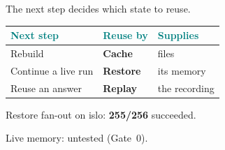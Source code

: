 \begin{frame}[t]{\ev{\tagM\,\tagP}The next step decides which state to reuse.}
\vspace{.1cm}
{\fontsize{14}{17}\selectfont\renewcommand{\arraystretch}{1.32}
\begin{tabularx}{\linewidth}{@{}L{5.1cm}L{3.6cm}Y@{}}
\toprule
\textcolor{Teal}{\textbf{Next step}} & \textcolor{Teal}{\textbf{Reuse by}} & \textcolor{Teal}{\textbf{Supplies}}\\
\midrule
Rebuild & \textbf{Cache} & files\\
Continue a live run & \textbf{Restore} & its memory\\
Reuse an answer & \textbf{Replay} & the recording\\
\bottomrule
\end{tabularx}\par}
\vspace{.4cm}
{\fontsize{13}{17}\selectfont\tagM\enspace Restore fan-out on islo: \textbf{255/256} succeeded.\par
\vspace{.12cm}\tagP\enspace Live memory: untested (Gate~0).\par}

\end{frame}
